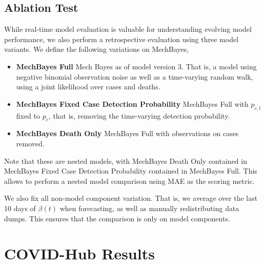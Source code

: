 \documentclass[11pt]{amsart}
\begin{document}
 \subsection{Ablation Test}
 
 While real-time model evaluation is valuable for understanding evolving model performance, we also perform a retrospective evaluation using three model variants. We define the following variations on MechBayes,
 
 \begin{itemize}
 \item \textbf{MechBayes Full} Mech Bayes as of model version 3. That is, a model using negative binomial observation noise as well as a time-varying random walk, using a joint likelihood over cases and deaths.
 
 \item \textbf{MechBayes Fixed Case Detection Probability} MechBayes Full with $p_{c,t}$ fixed to $p_c$, that is, removing the time-varying detection probability.
 
 \item \textbf{MechBayes Death Only} MechBayes Full with observations on cases removed.
 \end{itemize}
 
 Note that these are nested models, with MechBayes Death Only contained in MechBayes Fixed Case Detection Probability contained in MechBayes Full. This allows to perform a nested model comparison using MAE as the scoring metric. 
 
 We also fix all non-model component variation. That is, we average over the last 10 days of $\beta(t)$ when forecasting, as well as manually redistributing data dumps. This ensures that the comparison is only on model components.


\section{COVID-Hub Results}
\end{document}
